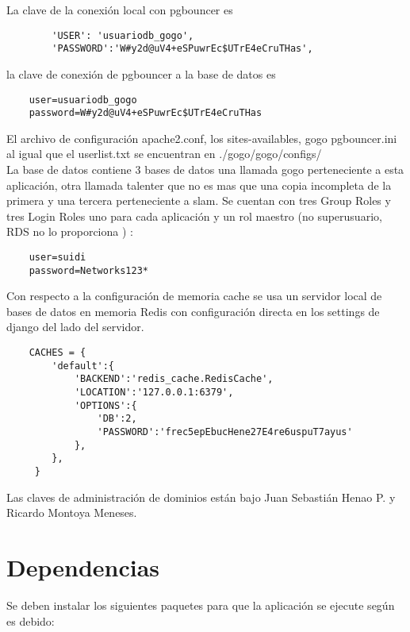 \documentclass[10pt,a4paper]{book}
\begin{document}
	La clave de la conexión local con pgbouncer es
	\begin{verbatim}
		'USER': 'usuariodb_gogo',
		'PASSWORD':'W#y2d@uV4+eSPuwrEc$UTrE4eCruTHas',
	\end{verbatim}
	
	la clave de conexión de pgbouncer a la base de datos es
	\begin{verbatim}
	user=usuariodb_gogo
	password=W#y2d@uV4+eSPuwrEc$UTrE4eCruTHas
	\end{verbatim}
	
	El archivo de configuración apache2.conf, los sites-availables, gogo pgbouncer.ini al igual que el userlist.txt se encuentran en ./gogo/gogo/configs/ \\
	
	La base de datos contiene 3 bases de datos una llamada gogo perteneciente a esta aplicación, otra llamada talenter que no es mas que una copia incompleta de la primera y una tercera perteneciente a slam. Se cuentan con tres Group Roles y tres Login Roles uno para cada aplicación y un rol maestro (no superusuario, RDS no lo proporciona ) :
	\begin{verbatim}
	user=suidi 
	password=Networks123*
	\end{verbatim}
	
	Con respecto a la configuración de memoria cache se usa un servidor local de bases de datos en memoria Redis con configuración directa en los settings de django del lado del servidor.
	
	\begin{verbatim}
	CACHES = {
	  	'default':{
	  		'BACKEND':'redis_cache.RedisCache',
	  		'LOCATION':'127.0.0.1:6379',
	  		'OPTIONS':{
	  			'DB':2,
	  			'PASSWORD':'frec5epEbucHene27E4re6uspuT7ayus'
	  		},
	  	},
	 }
	\end{verbatim}
	
	
	Las claves de administración de dominios están bajo Juan Sebastián Henao P. y Ricardo Montoya Meneses.
	
	\section{Dependencias}
	
	Se deben instalar los siguientes paquetes para que la aplicación se ejecute según es debido:
	
\end{document}
